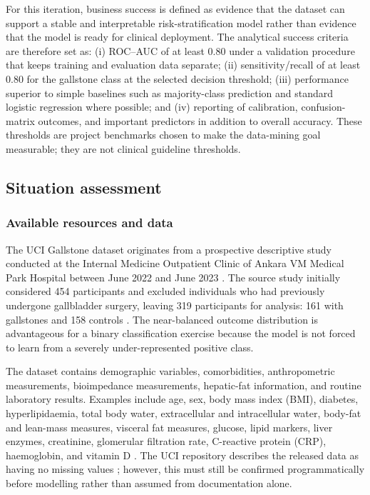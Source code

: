 For this iteration, business success is defined as evidence that the dataset can support a stable and interpretable risk-stratification model rather than evidence that the model is ready for clinical deployment. The analytical success criteria are therefore set as: (i) ROC--AUC of at least 0.80 under a validation procedure that keeps training and evaluation data separate; (ii) sensitivity/recall of at least 0.80 for the gallstone class at the selected decision threshold; (iii) performance superior to simple baselines such as majority-class prediction and standard logistic regression where possible; and (iv) reporting of calibration, confusion-matrix outcomes, and important predictors in addition to overall accuracy. These thresholds are project benchmarks chosen to make the data-mining goal measurable; they are not clinical guideline thresholds.

\subsection{Situation assessment}
\label{subsec:situation-assessment}

\subsubsection{Available resources and data}

The UCI Gallstone dataset originates from a prospective descriptive study conducted at the Internal Medicine Outpatient Clinic of Ankara VM Medical Park Hospital between June 2022 and June 2023 \cite{esen2024early,uci2025gallstone}. The source study initially considered 454 participants and excluded individuals who had previously undergone gallbladder surgery, leaving 319 participants for analysis: 161 with gallstones and 158 controls \cite{esen2024early}. The near-balanced outcome distribution is advantageous for a binary classification exercise because the model is not forced to learn from a severely under-represented positive class.

The dataset contains demographic variables, comorbidities, anthropometric measurements, bioimpedance measurements, hepatic-fat information, and routine laboratory results. Examples include age, sex, body mass index (BMI), diabetes, hyperlipidaemia, total body water, extracellular and intracellular water, body-fat and lean-mass measures, visceral fat measures, glucose, lipid markers, liver enzymes, creatinine, glomerular filtration rate, C-reactive protein (CRP), haemoglobin, and vitamin D \cite{esen2024early,uci2025gallstone}. The UCI repository describes the released data as having no missing values \cite{uci2025gallstone}; however, this must still be confirmed programmatically before modelling rather than assumed from documentation alone.

